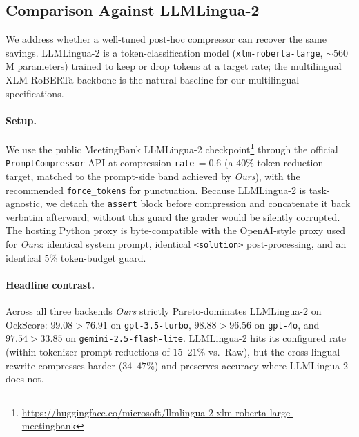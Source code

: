 \documentclass[11pt,a4paper,twocolumn]{article}
\begin{document}
\subsection{Comparison Against LLMLingua-2}
\label{sec:baselines}
We address whether a well-tuned post-hoc compressor can recover the same savings. LLMLingua-2 \cite{pan2024llmlingua2} is a token-classification model (\texttt{xlm-roberta-large}, $\sim\!560$\,M parameters) trained to keep or drop tokens at a target rate; the multilingual XLM-RoBERTa backbone is the natural baseline for our multilingual specifications.

\paragraph{Setup.} We use the public MeetingBank LLMLingua-2 checkpoint\footnote{\url{https://huggingface.co/microsoft/llmlingua-2-xlm-roberta-large-meetingbank}} through the official \texttt{PromptCompressor} API at compression \texttt{rate}\,$=0.6$ (a $40\%$ token-reduction target, matched to the prompt-side band achieved by \textit{Ours}), with the recommended \texttt{force\_tokens} for punctuation. Because LLMLingua-2 is task-agnostic, we detach the \texttt{assert} block before compression and concatenate it back verbatim afterward; without this guard the grader would be silently corrupted. The hosting Python proxy is byte-compatible with the OpenAI-style proxy used for \textit{Ours}: identical system prompt, identical \texttt{<solution>} post-processing, and an identical $5\%$ token-budget guard.

\paragraph{Headline contrast.} Across all three backends \textit{Ours} strictly Pareto-dominates LLMLingua-2 on OckScore: $99.08 > 76.91$ on \texttt{gpt-3.5-turbo}, $98.88 > 96.56$ on \texttt{gpt-4o}, and $97.54 > 33.85$ on \texttt{gemini-2.5-flash-lite}. LLMLingua-2 hits its configured rate (within-tokenizer prompt reductions of $15$--$21\%$ vs.\ Raw), but the cross-lingual rewrite compresses harder ($34$--$47\%$) and preserves accuracy where LLMLingua-2 does not.
\end{document}
